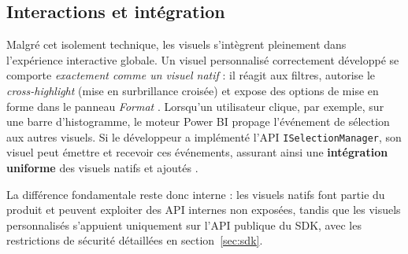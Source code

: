 \subsection{Interactions et intégration}
\label{subsec:interactions}

Malgré cet isolement technique, les visuels s’intègrent pleinement dans
l’expérience interactive globale.  
Un visuel personnalisé correctement développé se comporte \emph{exactement
comme un visuel natif} : il réagit aux filtres, autorise le
\textit{cross-highlight} (mise en surbrillance croisée) et expose des options
de mise en forme dans le panneau \emph{Format}
\parencite{MicrosoftCustomVisGuide2024}.  
Lorsqu’un utilisateur clique, par exemple, sur une barre d’histogramme, le
moteur Power BI propage l’événement de sélection aux autres visuels.
Si le développeur a implémenté l’API \verb|ISelectionManager|, son visuel
peut émettre et recevoir ces événements, assurant ainsi une \textbf{intégration
uniforme} des visuels natifs et ajoutés \parencite{MicrosoftSelectionAPI2024}.  

La différence fondamentale reste donc interne : les visuels natifs font
partie du produit et peuvent exploiter des API internes non exposées,
tandis que les visuels personnalisés s’appuient uniquement sur
l’API publique du SDK, avec les restrictions de sécurité détaillées en
section~\ref{sec:sdk}.